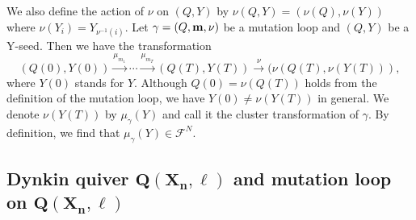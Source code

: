 \documentclass[pdftex]{sigma}
\numberwithin{equation}{section}
\begin{document}
We also define the action of $\nu$ on $(Q,Y)$ by $\nu(Q,Y)=(\nu(Q),\nu(Y))$ where $\nu(Y_i)=Y_{\nu^{-1}(i)}$.
Let $\gamma=(Q,{\bf m},\nu)$ be a mutation loop and $(Q,Y)$ be a Y-seed.
Then we have the transformation
\[(Q(0),Y(0))\overset{\mu_{m_1}}{\longrightarrow}\cdots\overset{\mu_{m_T}}{\longrightarrow}(Q(T),Y(T))\overset{\nu}{\longrightarrow}(\nu(Q(T),\nu(Y(T))),\]
where $Y(0)$ stands for $Y$.
Although $Q(0)=\nu(Q(T))$ holds from the definition of the mutation loop, we have $Y(0)\neq\nu(Y(T))$ in general.
We denote $\nu(Y(T))$ by $\mu_\gamma(Y)$ and call it the cluster transformation of $\gamma$.
By definition, we find that $\mu_\gamma(Y)\in\mathcal{F}^N$.

	\subsection[Dynkin quiver Q(X\_n,ell) and mutation loop on Q(X\_n,ell)]{Dynkin quiver $\boldsymbol{Q(X_n,\ell)}$ and mutation loop on $\boldsymbol{Q(X_n,\ell)}$}
\end{document}
